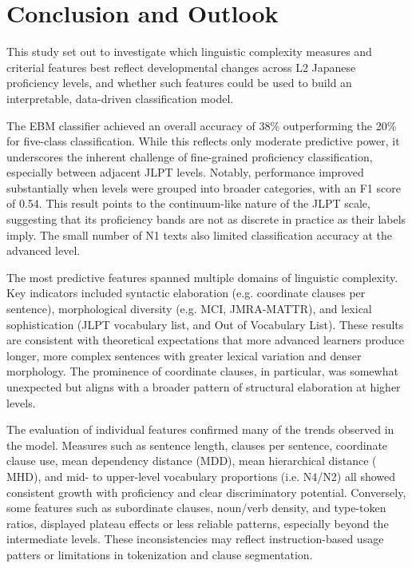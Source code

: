 \chapter{Conclusion and Outlook}
This study set out to investigate which linguistic complexity measures and criterial features best reflect
developmental changes across L2 Japanese proficiency levels, and whether such features could be used to build an
interpretable, data-driven classification model.



The EBM classifier achieved an overall accuracy of 38\% outperforming the 20\% for five-class classification. While
this reflects only moderate predictive power, it underscores the inherent challenge of fine-grained proficiency
classification, especially between adjacent JLPT levels. Notably, performance improved substantially when levels were
grouped into broader categories, with an F1 score of 0.54. This result points to the continuum-like nature of the
JLPT scale, suggesting that its proficiency bands are not as discrete in practice as their labels imply. The small
number of N1 texts also limited classification accuracy at the advanced level.

The most predictive features spanned multiple domains of linguistic complexity. Key indicators included syntactic
elaboration (e.g. coordinate clauses per sentence), morphological diversity (e.g. MCI, JMRA-MATTR), and lexical
sophistication (JLPT vocabulary list, and Out of Vocabulary List). These results are consistent with theoretical
expectations that more advanced learners produce longer, more complex sentences with greater lexical variation and
denser morphology. The prominence of coordinate clauses, in particular, was somewhat unexpected but aligns with a
broader pattern of structural elaboration at higher levels.

The evaluation of individual features confirmed many of the trends observed in the model. Measures such as sentence
length, clauses per sentence, coordinate clause use, mean dependency distance (MDD), mean hierarchical distance (
MHD), and mid- to upper-level vocabulary proportions (i.e. N4/N2) all showed consistent growth with proficiency and
clear discriminatory potential. Conversely, some features such as subordinate clauses, noun/verb density, and
type-token ratios, displayed plateau effects or less reliable patterns, especially beyond the intermediate levels.
These inconsistencies may reflect instruction-based usage patters or limitations in tokenization and clause
segmentation.

